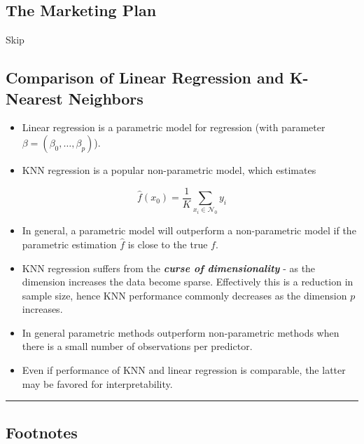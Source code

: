 \documentclass[11pt]{article}
\begin{document}
    \hypertarget{the-marketing-plan}{%
\subsection{The Marketing Plan}\label{the-marketing-plan}}

    Skip

    \hypertarget{comparison-of-linear-regression-and-k-nearest-neighbors}{%
\subsection{Comparison of Linear Regression and K-Nearest
Neighbors}\label{comparison-of-linear-regression-and-k-nearest-neighbors}}

    \begin{itemize}
\item
  Linear regression is a parametric model for regression (with parameter
  \(\beta = (\beta_0, \dots, \beta_p)\)).
\item
  KNN regression is a popular non-parametric model, which estimates
\end{itemize}

\[\hat{f}(x_0) = \frac{1}{K}\sum_{x_i\in\mathcal{N}_0} y_i \]

\begin{itemize}
\item
  In general, a parametric model will outperform a non-parametric model
  if the parametric estimation \(\hat{f}\) is close to the true \(f\).
\item
  KNN regression suffers from the \textbf{\emph{curse of
  dimensionality}} - as the dimension increases the data become sparse.
  Effectively this is a reduction in sample size, hence KNN performance
  commonly decreases as the dimension \(p\) increases.
\item
  In general parametric methods outperform non-parametric methods when
  there is a small number of observations per predictor.
\item
  Even if performance of KNN and linear regression is comparable, the
  latter may be favored for interpretability.
\end{itemize}

    \begin{center}\rule{0.5\linewidth}{\linethickness}\end{center}

\hypertarget{footnotes}{%
\subsection{Footnotes}\label{footnotes}}
\end{document}
